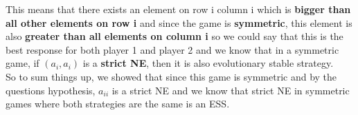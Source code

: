 \begin{latin}
  This means that there exists an element on row i column i which is \textbf{bigger than all other elements on row i} and since the game is \textbf{symmetric}, 
  this element is also \textbf{greater than all elements on column i} so we could say that this is the best response for both player 1 and player 2 and we know that in a 
  symmetric game, if $(a_i,a_i)$ is a \textbf{strict NE}, then it is also evolutionary stable strategy.\\
  So to sum things up, we showed that since this game is symmetric and by the questions hypothesis, $a_{ii}$ is a strict NE and we know that strict NE in symmetric games where both strategies are the same is an ESS.
\end{latin}